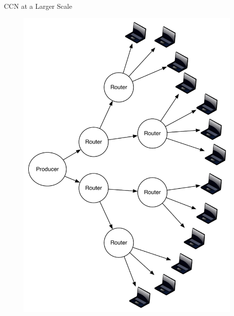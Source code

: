 \documentclass[handout]{beamer}
\begin{document}
\begin{frame}{CCN at a Larger Scale}
	\begin{figure}[h]
		\includegraphics[scale=0.3]{img/ndn_dist.pdf}
	\end{figure}
\end{frame}
\end{document}
